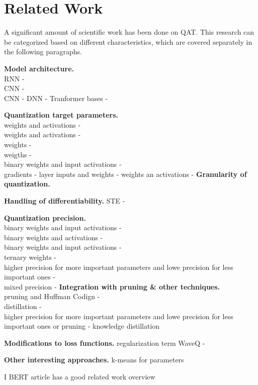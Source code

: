 \chapter{Related Work\label{cha:chapter5}}

A significant amount of scientific work has been done on QAT. 
This research can be categorized based on different characteristics, 
which are covered separately in the following paragraphs.

\noindent
\textbf{Model architecture.}\\
RNN - \cite{ott2016rnn}\\
CNN - \cite{rastegari2016xnor}\\
CNN - \cite{courbariaux2015binaryconnect}
DNN - \cite{yunchao2014compressing}
Tranformer bases - \cite{kim2021ibert}

\noindent
\textbf{Quantization target parameters.}\\
weights and activations - \cite{krishnamoorthi2018quantizing}\\
weights and activations - \cite{hubara2016qnn}\\
weights - \cite{polino2018modelcompression}\\
weigths - \cite{ott2016rnn}\\
binary weights and input activations - \cite{rastegari2016xnor}\\
gradients - \cite{shuchang2016dorafenet}
layer inputs and weights - \cite{Edouard2022SPIQ} 
weights an activations -  \cite{DBLP:conf/eccv/ZhangYYH18}
\noindent
\textbf{Granularity of quantization.}

\noindent
\textbf{Handling of differentiability.}
STE -  \cite{DBLP:conf/eccv/ZhangYYH18}

\noindent
\textbf{Quantization precision.}\\
binary weights and input activations - \cite{courbariaux2015binaryconnect}\\
binary weights and activations - \cite{hubara2016qnn}\\
binary weights and input activations - \cite{rastegari2016xnor}\\
ternary weights - \cite{ott2016rnn}\\
higher precision for more important parameters and lowe precision for less important ones - \cite{soroosh2018adaptive}\\
mixed precision - \cite{DBLP:conf/eccv/WangLGAC22}
\noindent
\textbf{Integration with pruning \& other techniques.}\\
pruning and Huffman Codign - \cite{han2016deepcompression}\\
distillation - \cite{polino2018modelcompression}\\
higher precision for more important parameters and lowe precision for less important ones or pruning - \cite{soroosh2018adaptive}
knowledge distillation \cite{DBLP:conf/eccv/WeiPQOY18}

\noindent
\textbf{Modifications to loss functions.}
regularization term WaveQ - \cite{DBLP:journals/corr/abs-2003-00146}

\noindent
\textbf{Other interesting approaches.}
k-means for parameters \cite{yunchao2014compressing}

I BERT article has a good related work overview